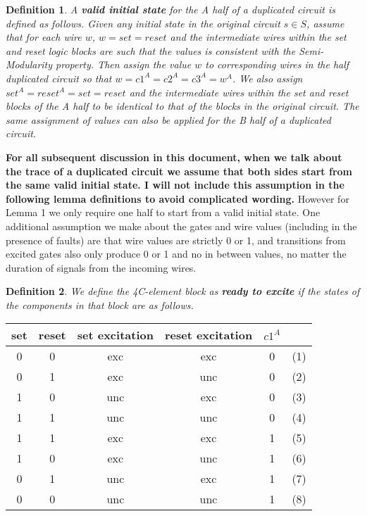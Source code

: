 \documentclass{article}
\newtheorem*{definition}{Definition}
\begin{document}
\begin{definition} A \textbf{valid initial state} for the A half of a duplicated circuit is defined as follows.  Given any initial state in the original circuit $s \in S$, assume that for each wire $w$, $w=set=reset$ and the intermediate wires within the set and reset logic blocks are such that the values is consistent with the Semi-Modularity property.  Then assign the value $w$ to corresponding wires in the half duplicated circuit so that $w=c1^A=c2^A=c3^A=w^A$.  We also assign $set^A=reset^A =set=reset$ and the intermediate wires within the set and reset blocks of the A half to be identical to that of the blocks in the original circuit.  The same assignment of values can also be applied for the B half of a duplicated circuit.
\end{definition}
\textbf{
For all subsequent discussion in this document, when we talk about the trace of a duplicated circuit we assume that both sides start from the same valid initial state.  I will not include this assumption in the following lemma definitions to avoid complicated wording.  }  However for Lemma 1 we only require one half to start from a valid initial state.  
One additional assumption we make about the gates and wire values (including in the presence of faults) are that wire values are strictly 0 or 1, and transitions from excited gates also only produce 0 or 1 and no in between values, no matter the duration of signals from the incoming wires.\newline

\begin{definition}
We define the 4C-element block as \textbf{ready to excite} if the states of the components in that block are as follows. 
\end{definition}
\begin{tabular}{ c | c | c | c |c|c}
  set & reset & set excitation & reset excitation & $c1^A$ \\
\hline
   0&0&exc&exc&0& (1)\\
   0&1&exc&unc&0 &(2)\\
   1&0&unc&exc&0 &(3)\\
   1&1&unc&unc&0 &(4)\\
   1&1&exc&exc&1 &(5)\\
   1&0&exc&unc&1 &(6)\\
   0&1&unc&exc&1 &(7)\\
   0&0&unc&unc&1 &(8)\\
\end{tabular}
\end{document}
